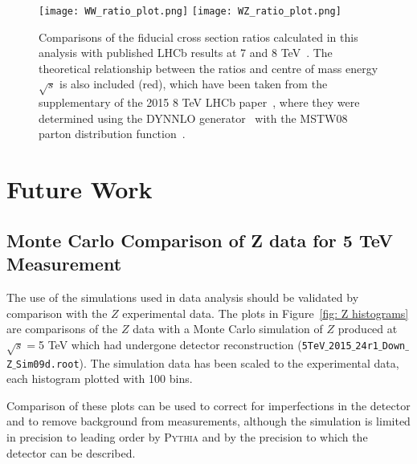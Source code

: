 \documentclass[a4paper]{article}
\begin{document}
\begin{figure}[t]
\centering
\texttt{[image: WW\_ratio\_plot.png]}
\texttt{[image: WZ\_ratio\_plot.png]} %
\vspace{-4mm}
\caption{\small Comparisons of the fiducial cross section ratios calculated in this analysis with published LHCb results at 7 and 8 TeV~\cite{7TeV_Z_2015,8TeV_W+Z_2015}. The theoretical relationship between the ratios and centre of mass energy $\sqrt{s}$ is also included (red), which have been taken from the supplementary of the 2015 8 TeV LHCb paper~\cite{8TeV_W+Z_2015}, where they were determined using the DYNNLO generator~\cite{DYNNLO} with the MSTW08 parton distribution function~\cite{MSTW08}.} 
\label{fig: ratio comparison}
\end{figure}


\section{Future Work} \label{sec: future work}
\subsection{Monte Carlo Comparison of Z data for 5 TeV Measurement} \label{Z histograms}
The use of the simulations used in data analysis should be validated by comparison with the $Z$ experimental data. 
The plots in Figure~\ref{fig: Z histograms} are comparisons of the $Z$ data with a Monte Carlo simulation of $Z$ produced at $\sqrt{s}=$5 TeV which had undergone detector reconstruction (\texttt{5TeV$\_$2015$\_$24r1$\_$Down$\_$Z$\_$Sim09d.root}). 
The simulation data has been scaled to the experimental data, each histogram plotted with 100 bins. 

Comparison of these plots can be used to correct for imperfections in the detector and to remove background from measurements, although the simulation is limited in precision to leading order by \textsc{Pythia} and by the precision to which the detector can be described.
\end{document}
